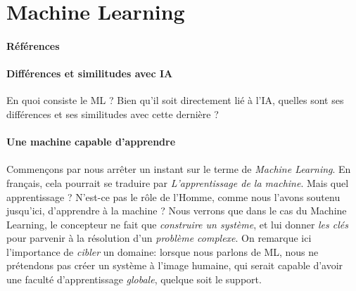 \section{Machine Learning}
\paragraph{Références} \cite{AlphaGo0} \cite{AlphaGo1} \cite{Internet3} \cite{Internet4} \cite{Internet5}

\paragraph{Différences et similitudes avec IA} En quoi consiste le ML ? Bien qu'il soit
directement lié à l'IA, quelles sont ses différences et ses similitudes avec cette dernière ?

\paragraph{Une machine capable d'apprendre}

\paragraph {} Commençons par nous arrêter un instant sur le terme de \emph{Machine Learning}. En français,
cela pourrait se traduire par \emph{L'apprentissage de la machine}. Mais quel apprentissage ? N'est-ce pas
le rôle de l'Homme, comme nous l'avons soutenu jusqu'ici, d'apprendre à la machine ? Nous verrons que dans
le cas du Machine Learning, le concepteur ne fait que \emph{construire un système}, et lui donner
\emph{les clés} pour parvenir à la résolution d'un \emph{problème complexe}. On remarque ici l'importance
de \emph{cibler} un domaine: lorsque nous parlons de ML, nous ne prétendons pas créer un système à l'image
humaine, qui serait capable d'avoir une faculté d'apprentissage \emph{globale}, quelque soit le support. 

